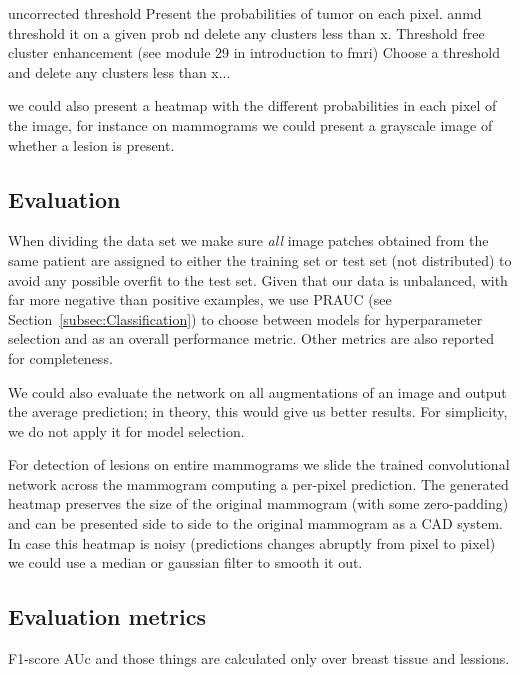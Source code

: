 uncorrected threshold
Present the probabilities of tumor on each pixel. anmd threshold it on a given prob nd delete any clusters less than x.
Threshold free cluster enhancement (see module 29 in introduction to fmri)
Choose a threshold and delete any clusters less than x...

we could also present a heatmap with the different probabilities in each pixel of the image, for instance on mammograms we could present a grayscale image of whether a lesion is present.






	\subsection{Evaluation}
	When dividing the data set we make sure \textit{all} image patches obtained from the same patient are assigned to either the training set or test set (not distributed) to avoid any possible overfit to the test set. Given that our data is unbalanced, with far more negative than positive examples, we use PRAUC (see Section~\ref{subsec:Classification}) to choose between models for hyperparameter selection and as an overall performance metric. Other metrics are also reported for completeness. 

	We could also evaluate the network on all augmentations of an image and output the average prediction; in theory, this would give us better results. For simplicity, we do not apply it for model selection.

	For detection of lesions on entire mammograms we slide the trained convolutional network across the mammogram computing a per-pixel prediction. The generated heatmap preserves the size of the original mammogram (with some zero-padding) and can be presented side to side to the original mammogram as a CAD system. In case this heatmap is noisy (predictions changes abruptly from pixel to pixel) we could use a median or gaussian filter to smooth it out.%
	\subsection{Evaluation metrics}
F1-score AUc and those things are calculated only over breast tissue and lessions.
